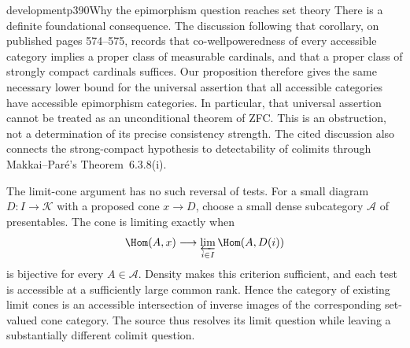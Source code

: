 \begin{dcomment}{development}{p390}{Why the epimorphism question reaches set theory}
There is a definite foundational consequence. The discussion following that corollary, on published pages 574--575, records that co-wellpoweredness of every accessible category implies a proper class of measurable cardinals, and that a proper class of strongly compact cardinals suffices. Our proposition therefore gives the same necessary lower bound for the universal assertion that all accessible categories have accessible epimorphism categories. In particular, that universal assertion cannot be treated as an unconditional theorem of ZFC. This is an obstruction, not a determination of its precise consistency strength. The cited discussion also connects the strong-compact hypothesis to detectability of colimits through Makkai--Par\'e's Theorem~6.3.8(i).

The limit-cone argument has no such reversal of tests. For a small diagram $D:I\to\mathcal K$ with a proposed cone $x\to D$, choose a small dense subcategory $\mathcal A$ of presentables. The cone is limiting exactly when
\[
 \Hom(A,x)\longrightarrow\varprojlim_{i\in I}\Hom(A,D(i))
\]
is bijective for every $A\in\mathcal A$. Density makes this criterion sufficient, and each test is accessible at a sufficiently large common rank. Hence the category of existing limit cones is an accessible intersection of inverse images of the corresponding set-valued cone category. The source thus resolves its limit question while leaving a substantially different colimit question.
\end{dcomment}

